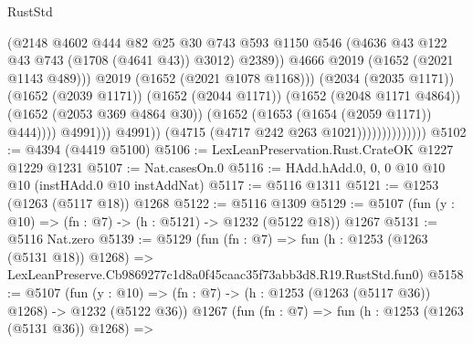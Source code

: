 \begin{lexlean}{RustStd}
\begin{coremodule}
                                                (@2148
                                                  @4602
                                                  @444
                                                  @82
                                                  @25
                                                  @30
                                                  @743
                                                  @593
                                                  @1150
                                                  @546
                                                  (@4636
                                                    @43
                                                    @122
                                                    @43
                                                    @743
                                                    (@1708 (@4641 @43))
                                                    @3012)
                                                  @2389))
                                              @4666
                                              @2019
                                              (@1652 (@2021 @1143 @489)))
                                            @2019
                                            (@1652 (@2021 @1078 @1168)))
                                          (@2034 (@2035 @1171))
                                          (@1652 (@2039 @1171))
                                          (@1652 (@2044 @1171))
                                          (@1652 (@2048 @1171 @4864))
                                          (@1652 (@2053 @369 @4864 @30))
                                          (@1652 (@1653 (@1654 (@2059 @1171)) @444))))
                                      @4991)))
                                @4991))
                            (@4715 (@4717 @242 @263 @1021))))))))))))))
@5102 := @4394 (@4419 @5100)
@5106 := LexLeanPreservation.Rust.CrateOK @1227 @1229 @1231
@5107 := Nat.casesOn.{0}
@5116 := HAdd.hAdd.{0, 0, 0} @10 @10 @10 (instHAdd.{0} @10 instAddNat)
@5117 := @5116 @1311
@5121 := @1253 (@1263 (@5117 @18)) @1268
@5122 := @5116 @1309
@5129 := @5107 (fun (y : @10) => (fn : @7) -> (h : @5121) -> @1232 (@5122 @18)) @1267
@5131 := @5116 Nat.zero
@5139 := @5129
    (fun (fn : @7) =>
    fun (h : @1253 (@1263 (@5131 @18)) @1268) =>
    LexLeanPreserve.Cb9869277c1d8a0f45caac35f73abb3d8.R19.RustStd.fun0)
@5158 := @5107
    (fun (y : @10) => (fn : @7) -> (h : @1253 (@1263 (@5117 @36)) @1268) -> @1232 (@5122 @36))
    @1267
    (fun (fn : @7) =>
    fun (h : @1253 (@1263 (@5131 @36)) @1268) =>

\end{coremodule}
\end{lexlean}
